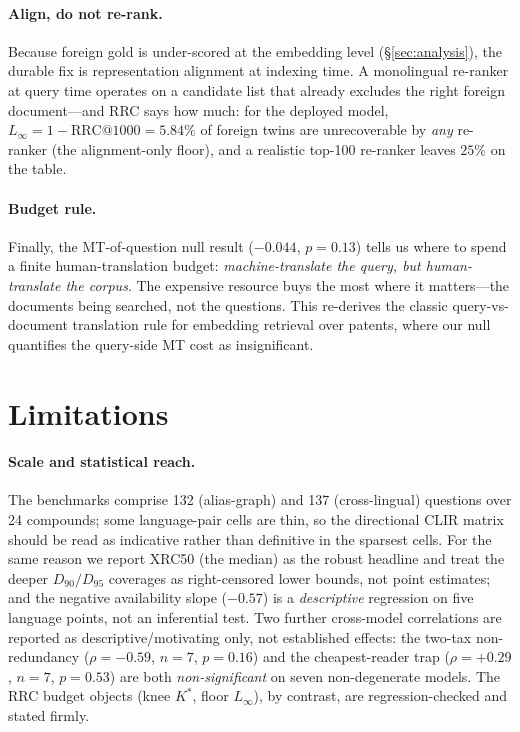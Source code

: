 \documentclass[11pt]{article}
\begin{document}
\paragraph{Align, do not re-rank.}
Because foreign gold is under-scored at the embedding level
(\S\ref{sec:analysis}), the durable fix is representation alignment at indexing
time. A monolingual re-ranker at query time operates on a candidate list that
already excludes the right foreign document---and RRC says how much: for the
deployed model, $L_\infty = 1-\mathrm{RRC@1000}=5.84\%$ of foreign twins are
unrecoverable by \emph{any} re-ranker (the alignment-only floor), and a realistic
top-100 re-ranker leaves $25\%$ on the table.

\paragraph{Budget rule.}
Finally, the MT-of-question null result ($-0.044$, $p=0.13$) tells us where to
spend a finite human-translation budget: \emph{machine-translate the query, but
human-translate the corpus}. The expensive resource buys the most where it
matters---the documents being searched, not the questions. This re-derives the
classic query-vs-document translation rule \citep{oard1998,salehpecina2020} for
embedding retrieval over patents, where our null quantifies the query-side MT
cost as insignificant.

\section*{Limitations}

\paragraph{Scale and statistical reach.}
The benchmarks comprise 132 (alias-graph) and 137 (cross-lingual) questions over
24 compounds; some language-pair cells are thin, so the directional CLIR matrix
should be read as indicative rather than definitive in the sparsest cells. For
the same reason we report XRC50 (the median) as the robust headline and treat
the deeper $D_{90}/D_{95}$ coverages as right-censored lower bounds, not point
estimates; and the negative availability slope ($-0.57$) is a \emph{descriptive}
regression on five language points, not an inferential test. Two further
cross-model correlations are reported as descriptive/motivating only, not
established effects: the two-tax non-redundancy
($\rho{=}{-}0.59$, $n{=}7$, $p{=}0.16$) and the cheapest-reader trap
($\rho{=}{+}0.29$, $n{=}7$, $p{=}0.53$) are both \emph{non-significant} on seven
non-degenerate models. The RRC budget objects (knee $K^{\!*}$, floor $L_\infty$),
by contrast, are regression-checked and stated firmly.
\end{document}
